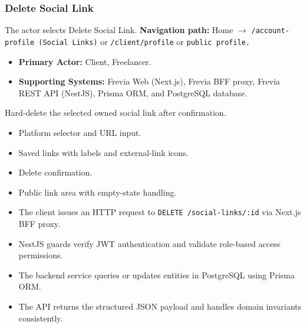 \subsubsection{Delete Social Link}

The actor selects Delete Social Link.\newline
\textbf{Navigation path:} Home $\rightarrow$ \texttt{/\allowbreak{}account-\allowbreak{}profile (Social Links)} or \texttt{/\allowbreak{}client/\allowbreak{}profile} or \texttt{public profile.}


\begin{itemize}[leftmargin=1.6em,topsep=3pt,itemsep=2pt,parsep=0pt,label=$\bullet$]
    \item \textbf{Primary Actor:} Client, Freelancer.
    \item \textbf{Supporting Systems:} Frevia Web (Next.js), Frevia BFF proxy, Frevia REST API (NestJS), Prisma ORM, and PostgreSQL database.
\end{itemize}

\noindent Hard-delete the selected owned social link after confirmation.

\begin{itemize}[leftmargin=1.6em,topsep=3pt,itemsep=2pt,parsep=0pt,label=$\bullet$]
    \item Platform selector and URL input.
    \item Saved links with labels and external-link icons.
    \item Delete confirmation.
    \item Public link area with empty-state handling.
\end{itemize}

\begin{itemize}[leftmargin=1.6em,topsep=3pt,itemsep=2pt,parsep=0pt,label=$\bullet$]
    \item The client issues an HTTP request to \texttt{DELETE /\allowbreak{}social-\allowbreak{}links/\allowbreak{}:\allowbreak{}id} via Next.js BFF proxy.
    \item NestJS guards verify JWT authentication and validate role-based access permissions.
    \item The backend service queries or updates entities in PostgreSQL using Prisma ORM.
    \item The API returns the structured JSON payload and handles domain invariants consistently.
\end{itemize}

